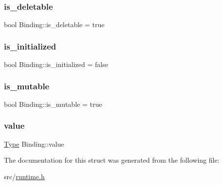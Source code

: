 \subsubsection{\texorpdfstring{is\+\_\+deletable}{is\_deletable}}
{\footnotesize\ttfamily bool Binding\+::is\+\_\+deletable = true}

\mbox{\label{struct_binding_aae232d870009e0669bf9d81229eafa80}} 
\subsubsection{\texorpdfstring{is\+\_\+initialized}{is\_initialized}}
{\footnotesize\ttfamily bool Binding\+::is\+\_\+initialized = false}

\mbox{\label{struct_binding_a0a6daae772f7935ec9b2ecd3d7c8b260}} 
\subsubsection{\texorpdfstring{is\+\_\+mutable}{is\_mutable}}
{\footnotesize\ttfamily bool Binding\+::is\+\_\+mutable = true}

\mbox{\label{struct_binding_a71c0f96fe4d74ab7cd7e61c0609a3c4c}} 
\subsubsection{\texorpdfstring{value}{value}}
{\footnotesize\ttfamily \hyperlink{class_type}{Type} Binding\+::value}



The documentation for this struct was generated from the following file\+:\begin{DoxyCompactItemize}
\item 
src/\hyperlink{runtime_8h}{runtime.\+h}\end{DoxyCompactItemize}
